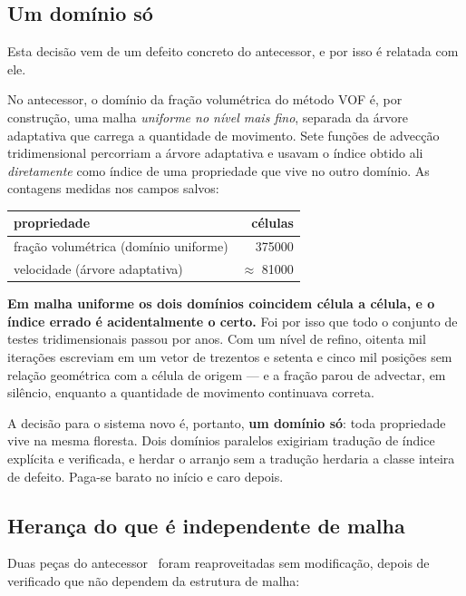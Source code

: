 \subsection{Um domínio só}
\label{sec:est-dominio}

Esta decisão vem de um defeito concreto do antecessor, e por isso é relatada com
ele.

No antecessor, o domínio da fração volumétrica do método VOF é, por construção,
uma malha \emph{uniforme no nível mais fino}, separada da árvore adaptativa que
carrega a quantidade de movimento. Sete funções de advecção tridimensional
percorriam a árvore adaptativa e usavam o índice obtido ali \emph{diretamente}
como índice de uma propriedade que vive no outro domínio. As contagens medidas
nos campos salvos:

\begin{center}
\begin{tabular}{lr}
\toprule
propriedade & células \\
\midrule
fração volumétrica (domínio uniforme) & \num{375000} \\
velocidade (árvore adaptativa)        & $\approx$ \num{81000} \\
\bottomrule
\end{tabular}
\end{center}

\textbf{Em malha uniforme os dois domínios coincidem célula a célula, e o índice
errado é acidentalmente o certo.} Foi por isso que todo o conjunto de testes
tridimensionais passou por anos. Com um nível de refino, oitenta mil iterações
escreviam em um vetor de trezentos e setenta e cinco mil posições sem relação
geométrica com a célula de origem --- e a fração parou de advectar, em silêncio,
enquanto a quantidade de movimento continuava correta.

A decisão para o sistema novo é, portanto, \textbf{um domínio só}: toda
propriedade vive na mesma floresta. Dois domínios paralelos exigiriam tradução de
índice explícita e verificada, e herdar o arranjo sem a tradução herdaria a
classe inteira de defeito. Paga-se barato no início e caro depois.

\subsection{Herança do que é independente de malha}

Duas peças do antecessor~\cite{sousa2019} foram reaproveitadas sem modificação, depois de
verificado que não dependem da estrutura de malha:

